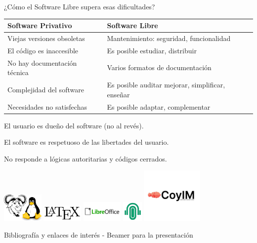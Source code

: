 \documentclass[spanish]{beamer}
\begin{document}
\begin{frame}{¿Cómo el Software Libre supera esas dificultades?}
    
    
    
    \centering
    \resizebox{12cm}{!}
    {
    \begin{tabular}{|l|l|}
        \hline        
        \rowcolor{lightgray}\textbf{Software Privativo} & \textbf{Software Libre}\\ 
        \hline
        \hline
        Viejas versiones obsoletas & Mantenimiento: seguridad, funcionalidad \\ 
        \hline
        El código es inaccesible & Es posible estudiar, distribuir \\
        \hline
        No hay documentación técnica & Varios formatos de documentación \\
        \hline
        Complejidad del software & Es posible auditar \MVRightArrow{} mejorar, simplificar, enseñar \\
        \hline
        Necesidades no satisfechas & Es posible adaptar, complementar \\
        \hline
    \end{tabular}
    }
    
    \vspace{0.3cm}
    El usuario es dueño del software (no al revés). 
    
    El software es respetuoso de las libertades del usuario.

    No responde a lógicas autoritarias y códigos cerrados.

    \includegraphics[width=2cm]{img/GNU_and_Tux.jpg}
    \includegraphics[width=2cm]{img/latex.jpg}
    \includegraphics[width=2cm]{img/libreoffice.png}
    \includegraphics[width=1cm]{img/wahay.jpg}
    \includegraphics[width=3cm]{img/coyim.jpeg}
    
    
\end{frame}

\begin{frame}{Bibliografía y enlaces de interés}
    - Beamer para la presentación

    
\end{frame}
\end{document}
